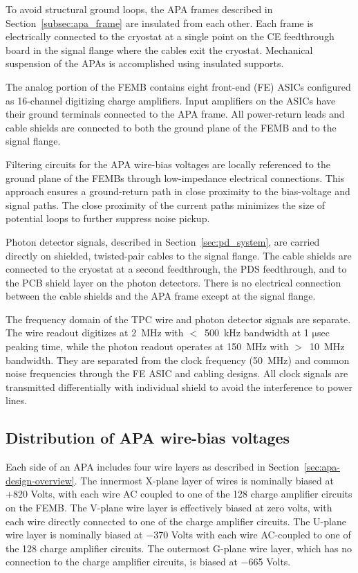 To avoid structural ground loops, the APA frames described in Section~\ref{subsec:apa_frame} 
are insulated from each other. Each frame is electrically connected to the cryostat at a single 
point on the CE feedthrough board in the signal flange where the cables exit the cryostat. Mechanical suspension of the APAs 
is accomplished using insulated supports. 

The analog portion of the FEMB contains eight front-end (FE) ASICs configured as 16-channel 
digitizing charge amplifiers. Input amplifiers on the ASICs have their ground terminals connected 
to the APA frame.  All power-return leads and cable shields 
are connected to both the ground plane of the FEMB and to the signal flange.

Filtering circuits for the APA wire-bias voltages are locally referenced to the ground plane of the FEMBs through low-impedance 
electrical connections. This approach ensures a ground-return path in close proximity to the 
bias-voltage and signal paths. The close proximity of the current paths minimizes the size of potential loops to further 
suppress noise pickup.

Photon detector signals, described in Section~\ref{sec:pd_system}, are carried directly on shielded, 
twisted-pair cables to the signal flange. The cable shields are connected to the 
cryostat at a second feedthrough, the PDS feedthrough, and to the PCB shield layer on the photon detectors. There is no 
electrical connection between the cable shields and the APA frame except at the signal flange.

The frequency domain of the TPC wire and photon detector signals are separate. The wire readout digitizes at 2~MHz 
with $<$~500~kHz bandwidth at 1 $\mathrm{\mu}$sec peaking time, while the photon readout operates at 150~MHz 
with $>$~10~MHz bandwidth. They are separated from the clock frequency (50~MHz) and common noise frequencies 
through the FE ASIC and cabling designs. All clock signals are transmitted differentially with individual shield 
to avoid the interference to power lines. 

%
\subsection{Distribution of APA wire-bias voltages}
\label{subsec:ce_wire_bias}

Each side of an APA includes four wire layers as described in Section~\ref{sec:apa-design-overview}. 
The innermost X-plane layer of wires is nominally biased at +820 Volts, with each wire AC coupled 
to one of the 128 charge amplifier circuits on the FEMB. The V-plane wire layer is effectively biased at zero volts, 
with each wire directly connected to one of the charge amplifier circuits. The U-plane wire layer is nominally 
biased at $-$370 Volts with each wire AC-coupled 
to one of the 128 charge amplifier circuits. The outermost G-plane wire layer,
which has no connection to the charge amplifier circuits, is biased at $-$665 Volts.

